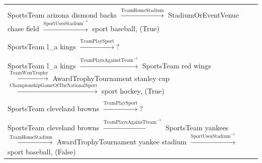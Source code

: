 \begin{table}[!h]
{\begin{tabular}{l l}
			\\ \\
			\textsf{SportsTeam arizona dismond backs}  $\xrightarrow{\text{TeamHomeStadium}}$
			\textsf{StadiumOrEventVenue chase field} $\xrightarrow{\text{SportUsesStadium}^{-1}}$ \textsf{sport baseball}, (True)
			\\ \\
			\textsf{SportsTeam l\_a kings} $\xrightarrow{\text{TeamPlaySport}}$? \vspace{-1mm}
			\\ \\
			\textsf{SportsTeam l\_a kings}  $\xrightarrow{\text{TeamPlaysAgainstTeam}^{-1}}$
			\textsf{SportsTeam red wings} $\xrightarrow{\text{TeamWonTrophy}}$ \textsf{AwardTrophyTournament stanley cup} $\xrightarrow{\text{ChampionshipGameOfTheNationalSport}}$ \textsf{sport hockey}, (True)
			\\ \\
			\textsf{SportsTeam cleveland browns} $\xrightarrow{\text{TeamPlaySport}}$? \vspace{-1mm}
			\\ \\
			\textsf{SportsTeam cleveland browns}  $\xrightarrow{\text{TeamPlaysAgainsTteam}^{-1}}$
			\textsf{SportsTeam yankees} $\xrightarrow{\text{TeamHomeStadium}}$ \textsf{AwardTrophyTournament yankee stadium} $\xrightarrow{\text{SportUsesStadium}^{-1}}$ \textsf{sport baseball}, (False)
			\\\hline
		\end{tabular}
 		}%
		\label{tab:kbc_example_paths}
	\end{table}


	

	

	

	


	


